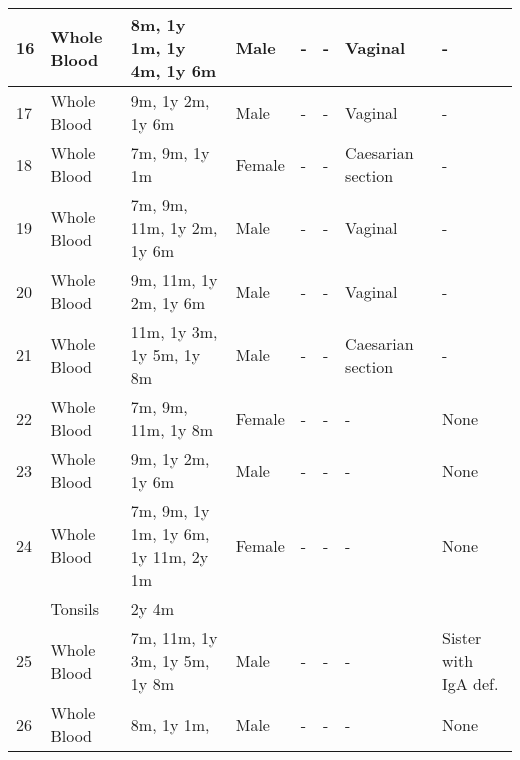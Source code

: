 \documentclass[12pt]{article}
\begin{document}
\begin{landscape}
\begin{longtable}[c]{|l | l |p{4cm}|l|l|l|l|l|}
					16 & Whole Blood & 8m, 1y 1m, 1y 4m, 1y 6m                                  & Male   & -         & -          & Vaginal           & -                    \\ \hline
					17 & Whole Blood & 9m, 1y 2m, 1y 6m                                         & Male   & -         & -          & Vaginal           & -                    \\ \hline
					18 & Whole Blood & 7m, 9m, 1y 1m                                            & Female & -         & -          & Caesarian section & -                    \\ \hline
					19 & Whole Blood & 7m, 9m, 11m, 1y 2m, 1y 6m                                & Male   & -         & -          & Vaginal           & -                    \\ \hline
					20 & Whole Blood & 9m, 11m, 1y 2m, 1y 6m                                    & Male   & -         & -          & Vaginal           & -                    \\ \hline
					21 & Whole Blood & 11m, 1y 3m, 1y 5m, 1y 8m                                 & Male   & -         & -          & Caesarian section & -                    \\ \hline
					22 & Whole Blood & 7m, 9m, 11m, 1y 8m                                       & Female & -         & -          & -                 & None                 \\ \hline
					23 & Whole Blood & 9m, 1y 2m, 1y 6m                                         & Male   & -         & -          & -                 & None                 \\ \hline
					24 & Whole Blood & 7m, 9m, 1y 1m, 1y 6m, 1y 11m, 2y 1m                      & Female & -         & -          & -                 & None                 \\
					   & Tonsils     & 2y 4m                                                    &        &           &            &                   &  \\ \hline
					25 & Whole Blood & 7m, 11m, 1y 3m, 1y 5m, 1y 8m                             & Male   & -         & -          & -                 & Sister with IgA def. \\ \hline
					26 & Whole Blood & 8m, 1y 1m,                                               & Male   & -         & -          & -                 & None
				\end{longtable}
			\end{landscape}	
				
	
	
	
	
	
	
	
	
\end{document}
